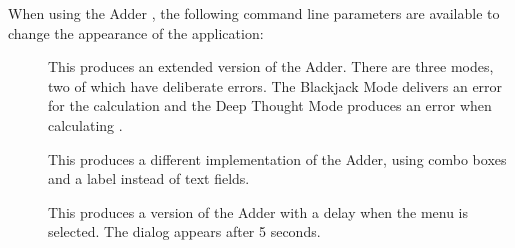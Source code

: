 When using the Adder \gdaut{}, the following command line parameters are 
available to change the appearance of the application:

\begin{description}
\item[]{This produces an extended version of the Adder. There are 
three modes, two of which have deliberate errors. The Blackjack Mode delivers an error for the calculation  and the Deep Thought Mode produces an error when calculating . } 
\item []{This produces a different implementation of the Adder, 
using combo boxes and a label instead of text fields.}
\item []{This produces a version of the Adder with a delay when the  menu is selected. The dialog appears after 5 seconds. }
\end{description}
